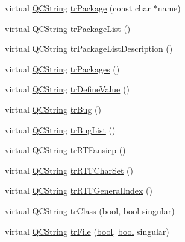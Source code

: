 \begin{DoxyCompactItemize}
\item 
virtual \hyperlink{class_q_c_string}{Q\+C\+String} \hyperlink{class_translator_german_a6bbbc46790ddf72833ba91d1562a5fba}{tr\+Package} (const char $\ast$name)
\item 
virtual \hyperlink{class_q_c_string}{Q\+C\+String} \hyperlink{class_translator_german_ac2172e032ba255dcbc2953a43ea2a3fd}{tr\+Package\+List} ()
\item 
virtual \hyperlink{class_q_c_string}{Q\+C\+String} \hyperlink{class_translator_german_a8bd8753934bc6d247bf149e5cad4e4ba}{tr\+Package\+List\+Description} ()
\item 
virtual \hyperlink{class_q_c_string}{Q\+C\+String} \hyperlink{class_translator_german_a1d76487fc4e16b36bd3d390de59487e8}{tr\+Packages} ()
\item 
virtual \hyperlink{class_q_c_string}{Q\+C\+String} \hyperlink{class_translator_german_a0a8974569143d2e83ecfdc13f2662f0d}{tr\+Define\+Value} ()
\item 
virtual \hyperlink{class_q_c_string}{Q\+C\+String} \hyperlink{class_translator_german_a267e8d5856041c0e81262ca2d85d6b82}{tr\+Bug} ()
\item 
virtual \hyperlink{class_q_c_string}{Q\+C\+String} \hyperlink{class_translator_german_a8ebf727ce0929525024d61e8604fe6e6}{tr\+Bug\+List} ()
\item 
virtual \hyperlink{class_q_c_string}{Q\+C\+String} \hyperlink{class_translator_german_af2c6ee419db83b590ee2bac3378c986b}{tr\+R\+T\+Fansicp} ()
\item 
virtual \hyperlink{class_q_c_string}{Q\+C\+String} \hyperlink{class_translator_german_acaec2d8679f438f699e0ce3d96da1e3c}{tr\+R\+T\+F\+Char\+Set} ()
\item 
virtual \hyperlink{class_q_c_string}{Q\+C\+String} \hyperlink{class_translator_german_aa5da41acc42a3db2e34097853a8da92c}{tr\+R\+T\+F\+General\+Index} ()
\item 
virtual \hyperlink{class_q_c_string}{Q\+C\+String} \hyperlink{class_translator_german_ab518854eb67b22b895074c0f845bfe42}{tr\+Class} (\hyperlink{qglobal_8h_a1062901a7428fdd9c7f180f5e01ea056}{bool}, \hyperlink{qglobal_8h_a1062901a7428fdd9c7f180f5e01ea056}{bool} singular)
\item 
virtual \hyperlink{class_q_c_string}{Q\+C\+String} \hyperlink{class_translator_german_a395c5b6625eec8a81089f4659dca9243}{tr\+File} (\hyperlink{qglobal_8h_a1062901a7428fdd9c7f180f5e01ea056}{bool}, \hyperlink{qglobal_8h_a1062901a7428fdd9c7f180f5e01ea056}{bool} singular)
\item 

\end{DoxyCompactItemize}
